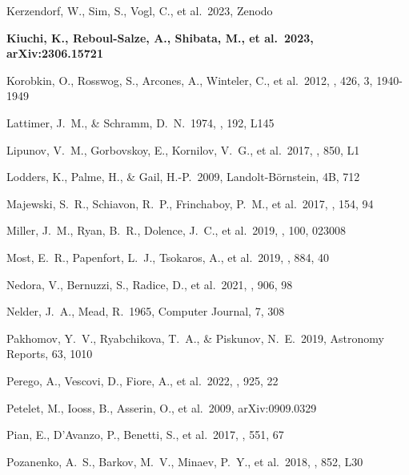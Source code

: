 \documentclass[twocolumn,twocolappendix]{aastex63}
\begin{document}
{{\begin{thebibliography}{}
 Kerzendorf, W., Sim, S., Vogl, C., et al.\ 2023, Zenodo


 \textbf{Kiuchi, K., Reboul-Salze, A., Shibata, M., et al.\ 2023, arXiv:2306.15721}


 Korobkin, O., Rosswog, S., Arcones, A., Winteler, C., et al.\ 2012, \mnras, 426, 3, 1940-1949


 Lattimer, J.~M., \& Schramm, D.~N.\ 1974, \apjl, 192, L145


 Lipunov, V.~M., Gorbovskoy, E., Kornilov, V.~G., et al.\ 2017, \apjl, 850, L1


 Lodders, K., Palme, H., \& Gail, H.-P.\ 2009, Landolt-B\"ornstein, 4B, 712


 Majewski, S.~R., Schiavon, R.~P., Frinchaboy, P.~M., et al.\ 2017, \aj, 154, 94


 Miller, J.~M., Ryan, B.~R., Dolence, J.~C., et al.\ 2019, \prd, 100, 023008


 Most, E.~R., Papenfort, L.~J., Tsokaros, A., et al.\ 2019, \apj, 884, 40


 Nedora, V., Bernuzzi, S., Radice, D., et al.\ 2021, \apj, 906, 98


 Nelder, J.~A., Mead, R.\ 1965, Computer Journal, 7, 308


 Pakhomov, Y.~V., Ryabchikova, T.~A., \& Piskunov, N.~E.\ 2019, Astronomy Reports, 63, 1010


 Perego, A., Vescovi, D., Fiore, A., et al.\ 2022, \apj, 925, 22


 Petelet, M., Iooss, B., Asserin, O., et al.\ 2009, arXiv:0909.0329


 Pian, E., D'Avanzo, P., Benetti, S., et al.\ 2017, \nat, 551, 67


 Pozanenko, A.~S., Barkov, M.~V., Minaev, P.~Y., et al.\ 2018, \apjl, 852, L30



\end{thebibliography}}}
\end{document}
